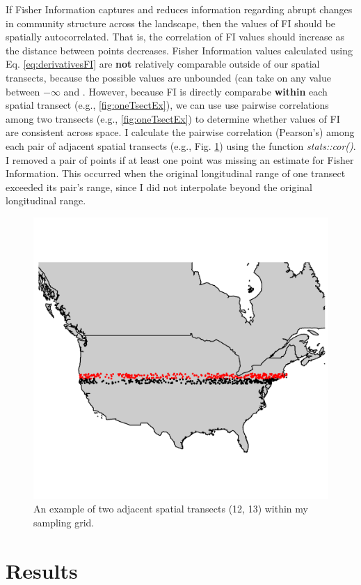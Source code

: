 \documentclass[12pt,twoside,openany]{reedthesis}
\begin{document}
If Fisher Information captures and reduces information regarding abrupt changes in community structure across the landscape, then the values of FI should be spatially autocorrelated. That is, the correlation of FI values should increase as the distance between points decreases. Fisher Information values calculated using Eq. \eqref{eq:derivativesFI} are \textbf{not} relatively comparable outside of our spatial transects, because the possible values are unbounded (can take on any value between \(-\infty\) and \(%
\). However, because FI is directly comparabe \textbf{within} each spatial transect (e.g., \ref{fig:oneTsectEx}), we can use use pairwise correlations among two transects (e.g., \ref{fig:oneTsectEx}) to determine whether values of FI are consistent across space. I calculate the pairwise correlation (Pearson's) among each pair of adjacent spatial transects (e.g., Fig. \ref{fig:adjacentTsectEx}) using the function \emph{stats::cor()}. I removed a pair of points if at least one point was missing an estimate for Fisher Information. This occurred when the original longitudinal range of one transect exceeded its pair's range, since I did not interpolate beyond the original longitudinal range.
\begin{figure}
\includegraphics[width=0.85\linewidth]{./chapterFiles/fisherSpatial/figures/figsCalledInDiss/transectSamplingEx_2rows} \caption{An example of two adjacent spatial transects (12, 13) within my sampling grid.}\label{fig:adjacentTsectEx}
\end{figure}
\hypertarget{results-1}{%
\section{Results}\label{results-1}}
\end{document}
